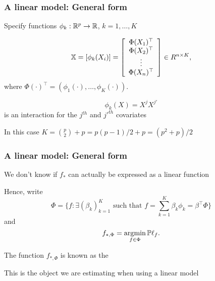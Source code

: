 \documentclass{beamer}
\begin{document}
\begin{frame}
\frametitle{A linear model: General form}
Specify 
functions $\phi_k:\mathbb{R}^p \rightarrow \mathbb{R}$, $k=1,\ldots,K$

\[
\mathbb{X} = 
\left[
\phi_k(X_i)
\right]
=
\left[
\begin{array}{c}
\Phi(X_{1})^{\top} \\
\Phi(X_{2})^{\top} \\
\vdots    \\
\Phi(X_{n})^{\top} \\
\end{array}
\right]
 \in R^{n\times K},
\]
where $\Phi(\cdot)^{\top} = (\phi_1(\cdot), \ldots, \phi_K(\cdot))$.

\vsp
{}
\[
\phi_k(X) = X^jX^{j'}
\]
is an interaction for the $j^{th}$ and $j'^{th}$ covariates

\vsp
In this case $K = {p \choose 2} + p = p(p-1)/2 + p = (p^2 + p)/2$
\end{frame}

\begin{frame}
\frametitle{A linear model: General form}
We don't know if $f_*$ can actually be expressed as a linear function

\vsp
Hence,  write
\[
\Phi = \{ f : \exists (\beta_k)_{k=1}^K \textrm{ such that } f = \sum_{k=1}^K \beta_k \phi_k = \beta^{\top} \Phi\}
\]
and 
\[
f_{*,\Phi} = \operatorname*{\arg\!\min}_{f \in \Phi} \mathbb{P}\ell_f.
\]

\vsp
The function $f_{*,\Phi}$ is known as the 

\vsp
This is the object we are estimating when using a linear model

\end{frame}


%
%
%
\end{document}
